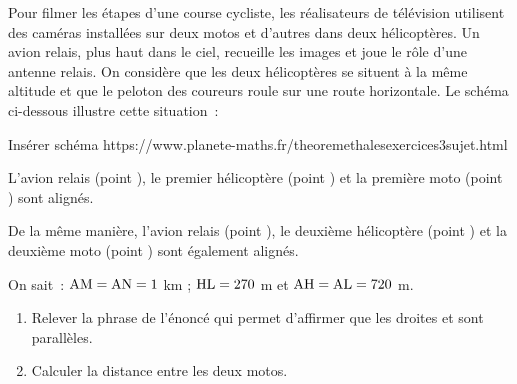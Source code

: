 \documentclass[exercice]{thedocument}%
\begin{document}
%
    Pour filmer les étapes d’une course cycliste, les réalisateurs de télévision
    utilisent des caméras installées sur deux motos et d’autres dans deux
    hélicoptères. Un avion relais, plus haut dans le ciel, recueille les images
    et joue le rôle d’une antenne relais. On considère que les deux hélicoptères
    se situent à la même altitude et que le peloton des coureurs roule sur une
    route horizontale. Le schéma ci-dessous illustre cette situation~:
    \begin{center}
        Insérer schéma
        https://www.planete-maths.fr/theoremethalesexercices3sujet.html
    \end{center}
    L’avion relais (point ), le premier hélicoptère (point
    ) et la première moto (point ) sont
    alignés.\medskip\par
    De la même manière, l’avion relais (point ), le deuxième
    hélicoptère (point ) et la deuxième moto (point )
    sont également alignés.\medskip\par
    On sait~: $\text{AM}=\text{AN}=1$ km ; $\text{HL}=270$ m et
    $\text{AH}=\text{AL}=720$ m.
    \begin{enumerate}
        \item Relever la phrase de l’énoncé qui permet d’affirmer que les droites
         et  sont parallèles.
        \item Calculer la distance  entre les deux motos.
    \end{enumerate}
\end{document}

